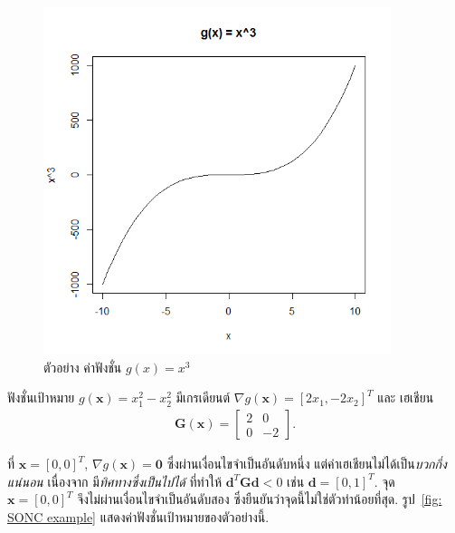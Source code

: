 %
\begin{figure}
\begin{center}
\includegraphics[width=4.0in]
{02Background/SONCexample01.png}
\end{center}
\caption{ตัวอย่าง ค่าฟังชั่น $g(x) = x^3$}
\label{fig: x^3}
\end{figure}
%

\begin{myexample}
ฟังชั่นเป้าหมาย $g(\mathbf{x}) = x_1^2 - x_2^2$ มีเกรเดียนต์ $\nabla g(\mathbf{x}) = [2 x_1, -2 x_2]^T$ และ เฮเชียน 
\begin{eqnarray}
   \mathbf{G}(\mathbf{x}) = \begin{bmatrix}
      2 & 0 \\
      0 & -2
   \end{bmatrix}.
\nonumber   
\end{eqnarray}

ที่ $\mathbf{x} = [0,0]^T$, $\nabla g(\mathbf{x}) = \mathbf{0}$ ซึ่งผ่านเงื่อนไขจำเป็นอันดับหนึ่ง 
แต่ค่าเฮเชียนไม่ได้เป็น\textit{บวกกึ่งแน่นอน} 
เนื่องจาก มี\textit{ทิศทางซึ่งเป็นไปได้} ที่ทำให้ $\mathbf{d}^T \mathbf{G} \mathbf{d} < 0$ 
เช่น $\mathbf{d} = [0,1]^T$.
จุด $\mathbf{x} = [0,0]^T$ จึงไม่ผ่านเงื่อนไขจำเป็นอันดับสอง ซึ่งยืนยันว่าจุดนี้ไม่ใช่ตัวทำน้อยที่สุด.
รูป~\ref{fig: SONC example} แสดงค่าฟังชั่นเป้าหมายของตัวอย่างนี้.

\end{myexample}

